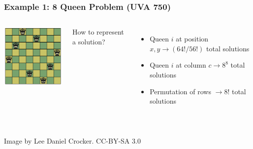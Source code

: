 \documentclass{beamer}
\begin{document}
\begin{frame}
  \frametitle{Example 1: 8 Queen Problem (UVA 750)}

  \begin{columns}
    \includegraphics[width=1\textwidth]{../img/8queen}

    How to represent a solution?

    \vfill

    {\small
    \begin{itemize}
    \item Queen $i$ at position $x,y \rightarrow (64! / 56!)$ total solutions
      
      \bigskip
      
    \item Queen $i$ at column $c \rightarrow 8^8$ total solutions
      
      \bigskip
      
    \item Permutation of rows $ \rightarrow 8!$ total solutions
    \end{itemize}}
  \end{columns}

  \vspace{3cm}
  
  \hrulefill\\
  {\tiny\hfill Image by Lee Daniel Crocker. CC-BY-SA 3.0}
\end{frame}
\end{document}
